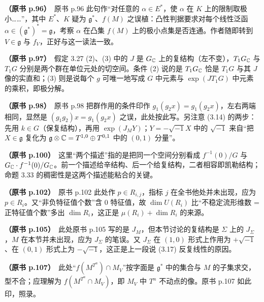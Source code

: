 \noindent \textbf{（原书 p.96）}\ 原书 p.96 此句作“对任意的 $\alpha\in E^*$，使 $\alpha$ 在 $K$ 上的限制取极小……”，其中 $E^*$、$K$ 疑为 $\mathfrak{g}^*$、$f(M)$ 之误植：凸性判据要求对每个线性泛函 $\alpha\in(\mathfrak{g}^*)^*=\mathfrak{g}$，考察 $\alpha$ 在凸集 $f(M)$ 上的极小点集是否连通。作者随即转到 $V\in\mathfrak{g}$ 与 $f_V$，正好与这一读法一致。\par\smallskip

\noindent \textbf{（原书 p.97）}\ 假定 3.27 (2)、(3) 中的 $J$ 是 $G_{\mathbb{C}}$ 上的复结构（左不变），$T_1G_{\mathbb{C}}$ 与 $T_1G$ 分别是两个群在单位元处的切空间。条件 (2) 说的是 $T_1G_{\mathbb{C}}$ 恰是 $T_1G$ 与其 $J$ 像的实直和；(3) 则是说每个 $g$ 可唯一地写成 $G$ 中元素与 $\exp(JT_1G)$ 中元素的乘积，即极分解。\par\smallskip

\noindent \textbf{（原书 p.98）}\ 原书 p.98 把群作用的条件印作 $g_1(g_2x)=g_1(g_2x)$，左右两端相同，显然是 $(g_1g_2)x=g_1(g_2x)$ 之误，此处按此写。另注意 (3.14) 的两步：先用 $k\in G$（保复结构），再用 $\exp(J_MY)$；$Y=-\sqrt{-1}X$ 中的 $\sqrt{-1}$ 来自“把 $X\in\mathfrak{g}$ 复化为 $\mathfrak{g}\otimes\mathbb{C}=T^{1,0}\oplus T^{0,1}$ 中的 $(0,1)$ 分量”。\par\smallskip

\noindent \textbf{（原书 p.100）}\ 这里“两个描述”指的是把同一个空间分别看成 $f^{-1}(0)/G$ 与 $G_{\mathbb{C}}\cdot f^{-1}(0)/G_{\mathbb{C}}$。前一个描述给辛结构、后一个给复结构，二者相容即凯勒结构；命题 3.33 的稠密性是这两个描述能粘合的关键。\par\smallskip

\noindent \textbf{（原书 p.102）}\ 原书 p.102 此处作 $p\in R_{i,j}$，指标 $j$ 在全书他处并未出现，应为 $p\in R_i$。又“非负特征值个数”含 0 特征值，故 $\dim U(R_i)$ 比“不稳定流形维数 = 正特征值个数”多出 $\dim R_i$，这正是 $\mu(R_i)+\dim R_i$ 的来源。\par\smallskip

\noindent \textbf{（原书 p.105）}\ 此处原书 p.105 写的是 $J_M$，但本节讨论的复结构是 $\Sigma$ 上的 $J_\Sigma$，$M$ 在本节并未出现，应为 $J_\Sigma$ 的笔误。又 $J_\Sigma$ 在 $(1,0)$ 形式上作用为 $+\sqrt{-1}$、在 $(0,1)$ 形式上为 $-\sqrt{-1}$，这正是上一段说 (3.17) 反复线性的原因。\par\smallskip

\noindent \textbf{（原书 p.107）}\ 此处“$f(M^{T^n})\cap M_V$”按字面是 $\mathfrak{g}^*$ 中的集合与 $M$ 的子集求交，型不合；应理解为 $f(M^{T^n}\cap M_V)$，即 $M_V$ 中 $T^n$ 不动点的像。原书 p.107 如此印，照录。\par\smallskip

